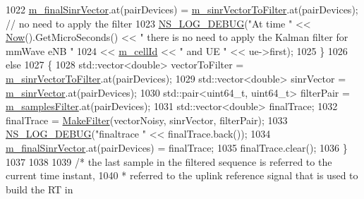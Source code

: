 \begin{DoxyCode}
1022                                         \hyperlink{classns3_1_1MmWaveEnbPhy_a6c34c832c1bcb05fab00a4435cc499d0}{m\_finalSinrVector}.at(pairDevices) = 
      \hyperlink{classns3_1_1MmWaveEnbPhy_a2887e6ce935c6d25fc2759269b811bbe}{m\_sinrVectorToFilter}.at(pairDevices); \textcolor{comment}{// no need to apply the filter}
1023                                         \hyperlink{group__logging_ga413f1886406d49f59a6a0a89b77b4d0a}{NS\_LOG\_DEBUG}(\textcolor{stringliteral}{"At time "} << 
      \hyperlink{group__simulator_gac3635e2e87f7ce316c89290ee1b01d0d}{Now}().GetMicroSeconds() << \textcolor{stringliteral}{" there is no need to apply the Kalman filter for mmWave eNB "}
1024                                                 << \hyperlink{classns3_1_1MmWavePhy_a0594531da45f93220d4f5de292bae823}{m\_cellId} << \textcolor{stringliteral}{" and UE "} << ue->first);
1025                                 \}
1026                                 \textcolor{keywordflow}{else}
1027                                 \{
1028                                         std::vector<double> vectorToFilter = 
      \hyperlink{classns3_1_1MmWaveEnbPhy_a2887e6ce935c6d25fc2759269b811bbe}{m\_sinrVectorToFilter}.at(pairDevices);
1029                                         std::vector<double> sinrVector = 
      \hyperlink{classns3_1_1MmWaveEnbPhy_a9e1e37ef62d54fbfc28bfd829e78f239}{m\_sinrVector}.at(pairDevices);
1030                                         std::pair<uint64\_t, uint64\_t> filterPair = 
      \hyperlink{classns3_1_1MmWaveEnbPhy_afee86fc55fdcef25ada2042be5740c62}{m\_samplesFilter}.at(pairDevices);
1031                                         std::vector<double> finalTrace;
1032                                         finalTrace = \hyperlink{classns3_1_1MmWaveEnbPhy_aa3e7651d7614326c712525bebb65066d}{MakeFilter}(vectorNoisy, sinrVector, 
      filterPair);
1033                                         \hyperlink{group__logging_ga413f1886406d49f59a6a0a89b77b4d0a}{NS\_LOG\_DEBUG}(\textcolor{stringliteral}{"finaltrace "} << finalTrace.back());
1034                                         \hyperlink{classns3_1_1MmWaveEnbPhy_a6c34c832c1bcb05fab00a4435cc499d0}{m\_finalSinrVector}.at(pairDevices) = finalTrace;
1035                                         finalTrace.clear();
1036                                 \}
1037                                         
1038                         
1039                                 \textcolor{comment}{/* the last sample in the filtered sequence is referred to the current time
       instant,}
1040 \textcolor{comment}{                                * referred to the uplink reference signal that is used to build the RT in
}
\end{DoxyCode}
